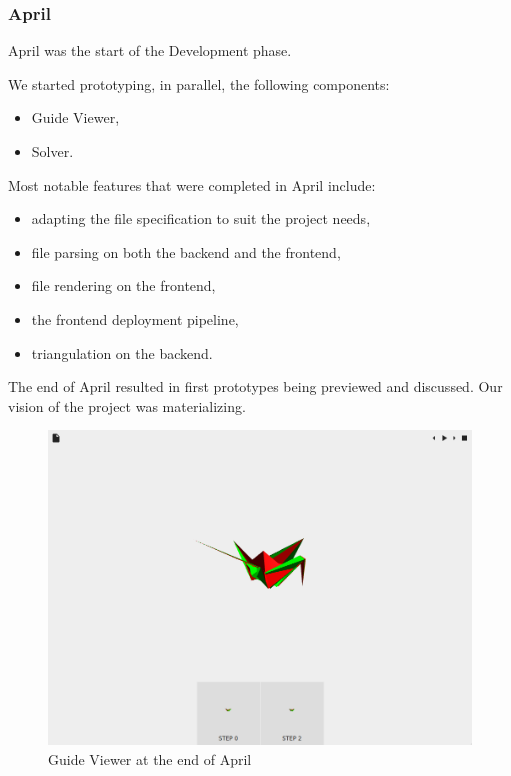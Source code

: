 \subsubsection{April}

April was the start of the Development phase.

We started prototyping, in parallel, the following components:
\begin{itemize}
	\item Guide Viewer,
	\item Solver.
\end{itemize}

Most notable features that were completed in April include:
\begin{itemize}
	\item adapting the  file specification to suit the project needs,
	\item {} file parsing on both the backend and the frontend,
	\item {} file rendering on the frontend,
	\item the frontend deployment pipeline,
	\item triangulation on the backend.
\end{itemize}
The end of April resulted in first prototypes being previewed and discussed. Our vision of the project was materializing.

\begin{figure}[H]
	\label{04-first-prototypes}
	\caption{Guide Viewer at the end of April}
  \centering
    \includegraphics[width=1.01\textwidth]{assets/prototype-front.png}
\end{figure}


